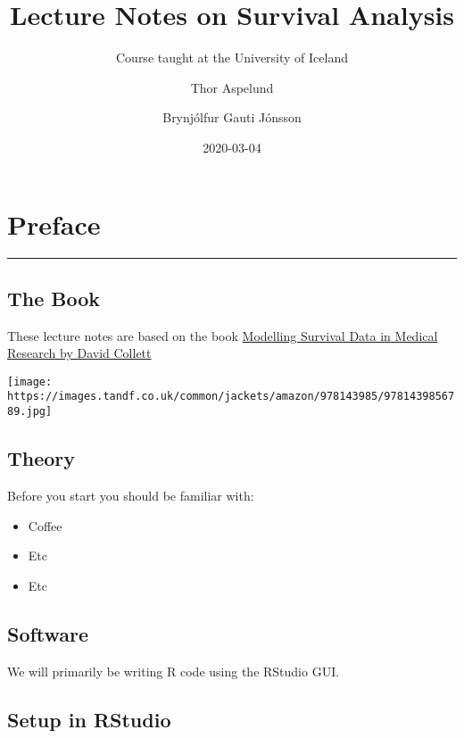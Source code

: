 \documentclass[
]{book}
\title{Lecture Notes on Survival Analysis}
\subtitle{Course taught at the University of Iceland}
\author{Thor Aspelund \and Brynjólfur Gauti Jónsson}
\date{2020-03-04}
\providecommand{\tightlist}{%
  \setlength{\itemsep}{0pt}\setlength{\parskip}{0pt}}
\begin{document}
\maketitle

{
\setcounter{tocdepth}{1}
\tableofcontents
}
\hypertarget{preface}{%
\chapter{Preface}\label{preface}}

\begin{center}\rule{0.5\linewidth}{0.5pt}\end{center}

\hypertarget{the-book}{%
\section{The Book}\label{the-book}}

These lecture notes are based on the book \href{https://www.crcpress.com/Modelling-Survival-Data-in-Medical-Research/Collett/p/book/9781439856789}{Modelling Survival Data in Medical Research by David Collett}

\texttt{[image: https://images.tandf.co.uk/common/jackets/amazon/978143985/9781439856789.jpg]}

\hypertarget{theory}{%
\section{Theory}\label{theory}}

Before you start you should be familiar with:

\begin{itemize}
\tightlist
\item
  Coffee
\item
  Etc
\item
  Etc
\end{itemize}

\hypertarget{software}{%
\section{Software}\label{software}}

We will primarily be writing R code using the RStudio GUI.

\hypertarget{setup-in-rstudio}{%
\section{Setup in RStudio}\label{setup-in-rstudio}}
\end{document}

